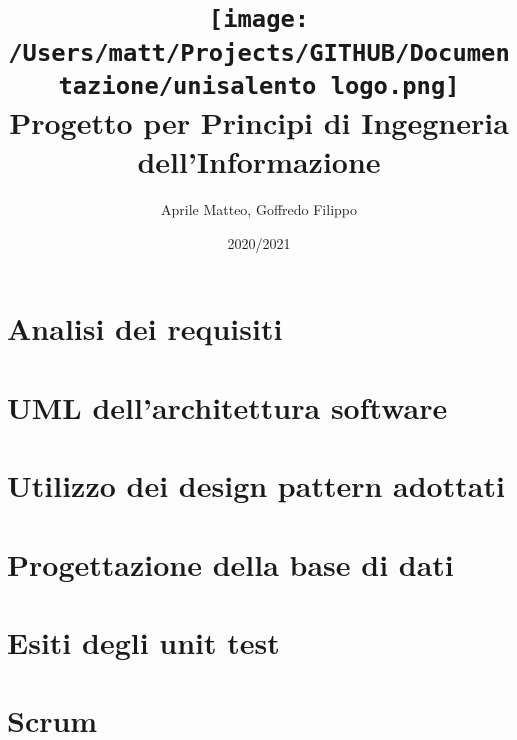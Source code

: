 \documentclass{report}
\title{
    \texttt{[image: /Users/matt/Projects/GITHUB/Documentazione/unisalento logo.png]} \\
    \huge {Progetto per Principi di Ingegneria dell'Informazione} \\
}
\author{Aprile Matteo, Goffredo Filippo}
\date{2020/2021}
\begin{document}
    
    \maketitle
    \tableofcontents

    \part{Analisi dei requisiti}
    
    
    
    
    

    \part{UML dell'architettura software}
    
    
    
    

    \part{Utilizzo dei design pattern adottati}
    
    
    \part{Progettazione della base di dati}
    
    
    

    \part{Esiti degli unit test}
    

    \part{Scrum}
    
    
\end{document}
